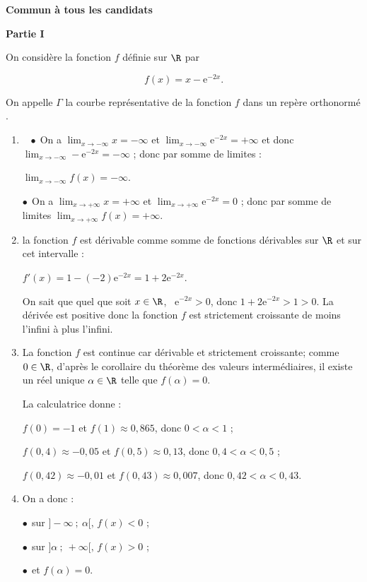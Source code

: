 \textbf{Commun à tous les candidats}

\medskip

\begin{center}\textbf{Partie I}\end{center}

On considère la fonction $f$ définie sur $\R$ par 

\[f(x) = x - \text{e}^{-2x}.\]

On appelle $\Gamma$ la courbe représentative de la fonction $f$ dans un repère orthonormé \Oij.

\medskip

\begin{enumerate}
\item ~
$\bullet~~$On a $\displaystyle\lim_{x \to - \infty} x = - \infty$ et $\displaystyle\lim_{x \to - \infty}\text{e}^{-2x} = + \infty$ et donc $\displaystyle\lim_{x \to - \infty}-\text{e}^{-2x} = - \infty$ ; donc par somme de limites :

$\displaystyle\lim_{x \to - \infty}f(x) = - \infty$.

$\bullet~~$On a $\displaystyle\lim_{x \to + \infty} x  = + \infty$ et $\displaystyle\lim_{x \to + \infty}\text{e}^{-2x} = 0$ ; donc par somme de limites  $\displaystyle\lim_{x \to + \infty}f(x) = + \infty$.
\item 
la fonction $f$ est dérivable comme somme de fonctions dérivables sur $\R$ et sur cet intervalle :

$f'(x) = 1 - (- 2)\text{e}^{-2x} = 1 + 2\text{e}^{-2x}$.

On sait que quel que soit $x \in \R$, \, $\text{e}^{-2x} > 0$, donc $ 1 + 2\text{e}^{-2x} > 1 > 0$.
La dérivée est positive donc la fonction $f$ est strictement croissante de moins l'infini à plus l'infini.
\item 
La fonction $f$ est continue car dérivable et strictement croissante; comme $0 \in \R$, d'après le corollaire du théorème des valeurs intermédiaires, il existe un réel unique $\alpha \in \R$ telle que $f(\alpha) = 0$.

La calculatrice donne  :

$f(0) = - 1$ et $f(1) \approx 0,865$, donc $0 < \alpha < 1$ ;

$f(0,4) \approx - 0,05$ et $f(0,5) \approx 0,13$, donc $0,4 < \alpha < 0,5$ ;

$f(0,42) \approx - 0,01$ et $f(0,43) \approx 0,007$, donc $0,42 < \alpha < 0,43$.
\item 
On a donc :

$\bullet~~$sur $]- \infty~;~\alpha[, \, f(x) < 0$ ;

$\bullet~~$sur $]\alpha~;~+ \infty[, \, f(x) > 0$ ;

$\bullet~~$et $f(\alpha) = 0$.
\end{enumerate}

